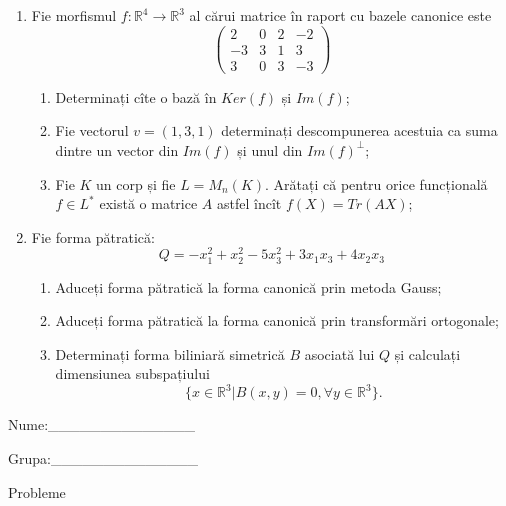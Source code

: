 \documentclass{article}
\begin{document}
\begin{enumerate}
 \item Fie morfismul $f:\mathbb{R}^4 \to \mathbb{R}^3$ al cărui matrice în raport cu bazele canonice este
$$\begin{pmatrix}
2&0&2&-2\\
-3&3&1&3\\
3&0&3&-3
\end{pmatrix}$$

\begin{enumerate}
\item Determinați cîte o bază în $Ker(f)$ și $Im(f)$;
\item Fie vectorul $v=(1,3,1)$ determinați descompunerea acestuia ca suma dintre un vector din $Im(f)$ și unul din $Im(f)^\perp$;
\item Fie $K$ un corp și fie $L=M_n(K)$. Arătați că pentru orice funcțională $f \in L^*$ există o matrice $A$ astfel încît $f(X)=Tr(AX)$;
\end{enumerate}
\item Fie forma pătratică:
$$Q= -x_1^2+x_2^2-5x_3^2+3x_1x_3+4x_2x_3$$

\begin{enumerate}
\item Aduceți forma pătratică la forma canonică prin metoda Gauss;
\item Aduceți forma pătratică la forma canonică prin transformări ortogonale;
\item Determinați forma biliniară simetrică $B$ asociată lui $Q$ și calculați dimensiunea subspațiului
$$\{x \in \mathbb{R}^3 | B(x,y)=0,\forall y \in \mathbb{R}^3\}.$$

\end{enumerate}
\end{enumerate}
\newpage
\begin{flushright}
Nume:\_\_\_\_\_\_\_\_\_\_\_\_\_\_
 
 
Grupa:\_\_\_\_\_\_\_\_\_\_\_\_\_\_
\end{flushright}
\begin{center}
\vspace{2cm}
{\Large Probleme}
\vspace{2cm}
\end{center}
\end{document}
